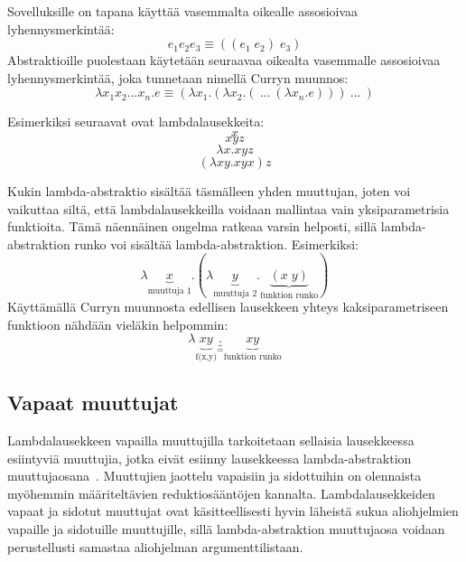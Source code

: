 Sovelluksille on tapana käyttää vasemmalta oikealle assosioivaa lyhennysmerkintää: 
\[e_{1} e_{2} e_{3} \equiv ((e_{1} \; e_{2}) \; e_{3})\]
Abstraktioille puolestaan käytetään seuraavaa oikealta vasemmalle assosioivaa lyhennysmerkintää, joka tunnetaan nimellä Curryn muunnos: 
\[ \lambda x_{1}x_{2}...x_{n}.e \equiv (\lambda x_{1} . ( \lambda x_{2} . ( \: ... \: ( \lambda x_{n} . e ))) \: ... \: ) \]

\par
Esimerkiksi seuraavat ovat lambdalausekkeita:
\[ x \]
\[ xyz \]
\[ \lambda x . xyz \]
\[ (\lambda xy . xyx) z \]

\par

Kukin lambda-abstraktio sisältää täsmälleen yhden muuttujan, joten voi vaikuttaa siltä, että lambdalausekkeilla voidaan mallintaa vain yksiparametrisia funktioita. Tämä näennäinen ongelma ratkeaa varsin helposti, sillä lambda-abstraktion runko voi sisältää lambda-abstraktion. Esimerkiksi:
\[ \lambda \underbrace{x}_{\text{muuttuja 1}} . ( \lambda \underbrace{y}_{\text{muuttuja 2}} . \underbrace{(x \; y)}_{\text{funktion runko}} ) \]
Käyttämällä Curryn muunnosta edellisen lausekkeen yhteys kaksiparametriseen funktioon nähdään vieläkin helpommin:
\[ \lambda \underbrace{xy}_{\text{f(x,y)}} \underbrace{.}_{=} \underbrace{xy}_{\text{funktion runko}}  \]

\subsection{Vapaat muuttujat}

Lambdalausekkeen vapailla muuttujilla tarkoitetaan sellaisia lausekkeessa esiintyviä muuttujia, jotka eivät esiinny lausekkeessa lambda-abstraktion muuttujaosana~\cite[s.~8]{Hudak89}. Muuttujien jaottelu vapaisiin ja sidottuihin on olennaista myöhemmin määriteltävien reduktiosääntöjen kannalta. Lambdalausekkeiden vapaat ja sidotut muuttujat ovat käsitteellisesti hyvin läheistä sukua aliohjelmien vapaille ja sidotuille muuttujille, sillä lambda-abstraktion muuttujaosa voidaan perustellusti samastaa aliohjelman argumenttilistaan.

